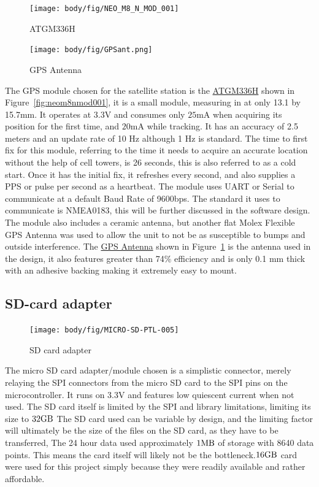 \begin{figure}[!htb]
	\texttt{[image: body/fig/NEO\_M8\_N\_MOD\_001]}
	\caption{ATGM336H}
	\label{fig:neom8nmod001}
	\endminipage\hfill
	\texttt{[image: body/fig/GPSant.png]}
	\caption[GPS Antenna]{GPS Antenna}
	\label{fig:gps-1ant}
	\endminipage\hfill
\end{figure}
\noindent
The GPS module chosen for the satellite station is the \href{https://www.robotics.org.za/NEO-M8N-MOD}{ATGM336H} shown in Figure~\ref{fig:neom8nmod001}, it is a small module, measuring in at only 13.1 by 15.7mm. It operates at $3.3 \si{\volt}$ and consumes only $25 \si{\milli\ampere}$ when acquiring its position for the first time, and  $20 \si{\milli\ampere}$ while tracking. It has an accuracy of 2.5 meters and an update rate of 10 Hz although 1 Hz is standard. The time to first fix for this module, referring to the time it needs to acquire an accurate location without the help of cell towers, is 26 seconds, this is also referred to as a cold start. Once it has the initial fix, it refreshes every second, and also supplies a PPS or pulse per second as a heartbeat. The module uses UART or Serial to communicate at a default Baud Rate of 9600bps. The standard it uses to communicate is NMEA0183, this will be further discussed in the software design. The module also includes a ceramic antenna, but another flat Molex Flexible GPS Antenna was used to allow the unit to not be as susceptible to bumps and outside interference.
The \href{https://www.robotics.org.za/GPS-15246?search=antenna}{GPS Antenna} shown in Figure~\ref{fig:gps-1ant} is the antenna used in the design, it also features greater than 74\% efficiency and is only 0.1 mm thick with an adhesive backing making it extremely easy to mount.

\pagebreak
\subsection{SD-card adapter}
\begin{figure}[!htb]
	\centering
	\texttt{[image: body/fig/MICRO-SD-PTL-005]}
	\caption{SD card adapter}
	\label{fig:micro-sd-ptl-005}
\end{figure}

\noindent
The micro SD card adapter/module chosen is a simplistic connector, merely relaying the SPI connectors from the micro SD card to the SPI pins on the microcontroller. It runs on 3.3V and features low quiescent current when not used. The SD card itself is limited by the SPI and library limitations, limiting its size to $ 32 \si{\giga\byte} $ The SD card used can be variable by design, and the limiting factor will ultimately be the size of the files on the SD card, as they have to be transferred, The 24 hour data used approximately $ 1 \si{\mega\byte} $ of storage with 8640 data points. This means the card itself will likely not be the bottleneck.$ 16 \si{\giga\byte} $ card were used for this project simply because they were readily available and rather affordable.




